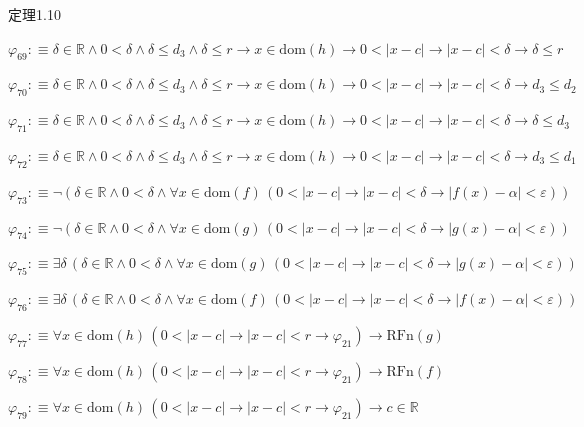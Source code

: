 \begin{fullproof}{定理1.10}
\begin{abbrevlist}
\item $\varphi_{69} :\equiv \delta \in \mathbb{R} \land 0 < \delta \land \delta \leq d_{3} \land \delta \leq r \to x \in \mathrm{dom}(h) \to 0 < \lvert x - c \rvert \to \lvert x - c \rvert < \delta \to \delta \leq r$
\item $\varphi_{70} :\equiv \delta \in \mathbb{R} \land 0 < \delta \land \delta \leq d_{3} \land \delta \leq r \to x \in \mathrm{dom}(h) \to 0 < \lvert x - c \rvert \to \lvert x - c \rvert < \delta \to d_{3} \leq d_{2}$
\item $\varphi_{71} :\equiv \delta \in \mathbb{R} \land 0 < \delta \land \delta \leq d_{3} \land \delta \leq r \to x \in \mathrm{dom}(h) \to 0 < \lvert x - c \rvert \to \lvert x - c \rvert < \delta \to \delta \leq d_{3}$
\item $\varphi_{72} :\equiv \delta \in \mathbb{R} \land 0 < \delta \land \delta \leq d_{3} \land \delta \leq r \to x \in \mathrm{dom}(h) \to 0 < \lvert x - c \rvert \to \lvert x - c \rvert < \delta \to d_{3} \leq d_{1}$
\item $\varphi_{73} :\equiv \neg (\delta \in \mathbb{R} \land 0 < \delta \land \forall x \in \mathrm{dom}(f)\,(0 < \lvert x - c \rvert \to \lvert x - c \rvert < \delta \to \lvert f(x) - \alpha \rvert < \varepsilon))$
\item $\varphi_{74} :\equiv \neg (\delta \in \mathbb{R} \land 0 < \delta \land \forall x \in \mathrm{dom}(g)\,(0 < \lvert x - c \rvert \to \lvert x - c \rvert < \delta \to \lvert g(x) - \alpha \rvert < \varepsilon))$
\item $\varphi_{75} :\equiv \exists \delta\,(\delta \in \mathbb{R} \land 0 < \delta \land \forall x \in \mathrm{dom}(g)\,(0 < \lvert x - c \rvert \to \lvert x - c \rvert < \delta \to \lvert g(x) - \alpha \rvert < \varepsilon))$
\item $\varphi_{76} :\equiv \exists \delta\,(\delta \in \mathbb{R} \land 0 < \delta \land \forall x \in \mathrm{dom}(f)\,(0 < \lvert x - c \rvert \to \lvert x - c \rvert < \delta \to \lvert f(x) - \alpha \rvert < \varepsilon))$
\item $\varphi_{77} :\equiv \forall x \in \mathrm{dom}(h)\,(0 < \lvert x - c \rvert \to \lvert x - c \rvert < r \to \varphi_{21}) \to \mathrm{RFn}(g)$
\item $\varphi_{78} :\equiv \forall x \in \mathrm{dom}(h)\,(0 < \lvert x - c \rvert \to \lvert x - c \rvert < r \to \varphi_{21}) \to \mathrm{RFn}(f)$
\item $\varphi_{79} :\equiv \forall x \in \mathrm{dom}(h)\,(0 < \lvert x - c \rvert \to \lvert x - c \rvert < r \to \varphi_{21}) \to c \in \mathbb{R}$

\end{abbrevlist}
\end{fullproof}
